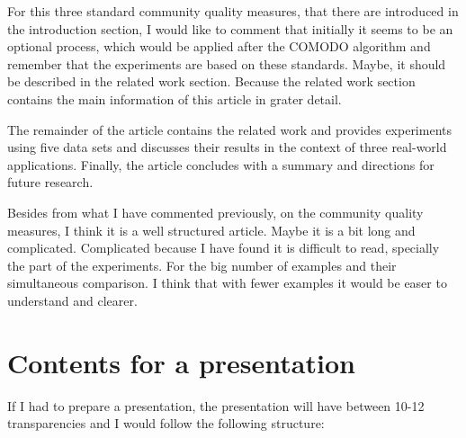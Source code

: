 \documentclass[a4paper]{article}
\begin{document}
For this three standard community quality measures, that there are introduced in the introduction section, I would like to comment that initially it seems to be an optional process, which would be applied after the COMODO algorithm and remember that the experiments are based on these standards. Maybe, it should be described in the related work section. Because the related work section contains the main information of this article in grater detail.
\vskip 0.35cm

The remainder of the article contains the related work and provides experiments using five data sets and discusses their results in the context of three real-world applications. Finally, the article concludes with a summary and directions for future research.
\vskip 0.35cm

Besides from what I have commented previously, on the community quality measures, I think it is a well structured article. Maybe it is a bit long and complicated. Complicated because I have found it is difficult to read, specially the part of the experiments. For the big number of examples and their simultaneous comparison. I think that with fewer examples it would be easer to understand and clearer.

\section*{Contents for a presentation}
If I had to prepare a presentation, the presentation will have between 10-12 transparencies and I would follow the following structure:
\end{document}
